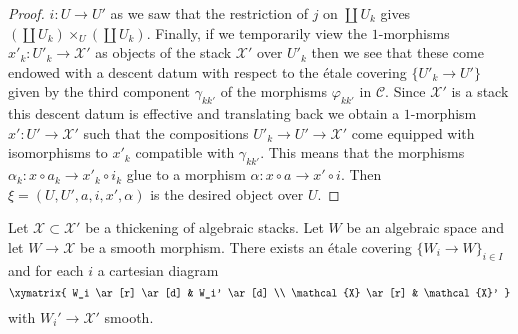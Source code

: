 \begin{proof}
$i : U \to U'$ as we saw that the restriction of $j$ on
$\coprod U_k$ gives $(\coprod U_k) \times_U (\coprod U_k)$.
Finally, if we temporarily view the $1$-morphisms
$x'_k : U'_k \to \mathcal{X}'$ as objects of the stack
$\mathcal{X}'$ over $U'_k$ then we see that these come endowed with a
descent datum with respect to the \'etale covering
$\{U'_k \to U'\}$ given by the third component $\gamma_{kk'}$
of the morphisms $\varphi_{kk'}$ in $\mathcal{C}$.
Since $\mathcal{X}'$ is a stack
this descent datum is effective and translating back we obtain
a $1$-morphism $x' : U' \to \mathcal{X}'$ such that the compositions
$U'_k \to U' \to \mathcal{X}'$ come equipped with isomorphisms to $x'_k$
compatible with $\gamma_{kk'}$. This means that the morphisms
$\alpha_k : x \circ a_k \to x'_k \circ i_k$ glue to a morphism
$\alpha : x \circ a \to x' \circ i$. Then $\xi = (U, U', a, i, x', \alpha)$
is the desired object over $U$.
\end{proof}

\begin{lemma}
\label{lemma-etale-local-lifts}
Let $\mathcal{X} \subset \mathcal{X}'$ be a thickening of algebraic stacks.
Let $W$ be an algebraic space and let $W \to \mathcal{X}$ be a smooth morphism.
There exists an \'etale covering $\{W_i \to W\}_{i \in I}$ and for each $i$
a cartesian diagram
$$
\xymatrix{
W_i \ar[r] \ar[d] & W_i' \ar[d] \\
\mathcal{X} \ar[r] & \mathcal{X}'
}
$$
with $W_i' \to \mathcal{X}'$ smooth.
\end{lemma}


